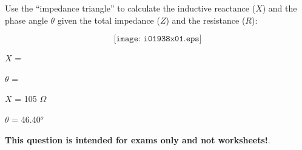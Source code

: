 

Use the ``impedance triangle'' to calculate the inductive reactance ($X$) and the phase angle $\theta$ given the total impedance ($Z$) and the resistance ($R$):

$$\texttt{[image: i01938x01.eps]}$$

\vskip 20pt

$X$ = 

\vskip 10pt

$\theta$ = 







$X$ = 105 $\Omega$

\vskip 10pt

$\theta$ = 46.40$^{o}$







{\bf This question is intended for exams only and not worksheets!}.



